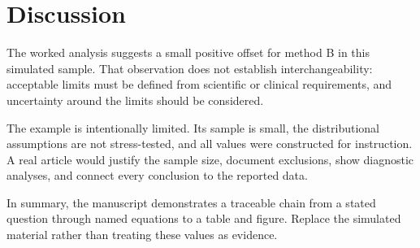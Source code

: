 \section{Discussion}
\label{sec:discussion}

The worked analysis suggests a small positive offset for method B in this
simulated sample. That observation does not establish interchangeability:
acceptable limits must be defined from scientific or clinical requirements,
and uncertainty around the limits should be considered.

The example is intentionally limited. Its sample is small, the distributional
assumptions are not stress-tested, and all values were constructed for
instruction. A real article would justify the sample size, document exclusions,
show diagnostic analyses, and connect every conclusion to the reported data.

In summary, the manuscript demonstrates a traceable chain from a stated
question through named equations to a table and figure. Replace the simulated
material rather than treating these values as evidence.
